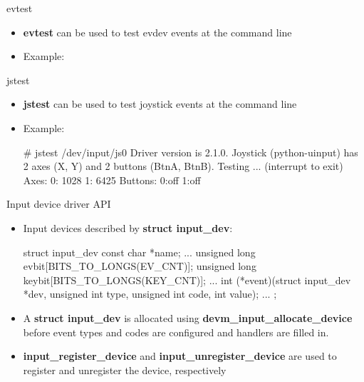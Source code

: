\begin{frame}
	{evtest}

	\begin{itemize}
		\item \textbf{evtest} can be used to test evdev events at the command line
		\item Example:
	\end{itemize}
\end{frame}

\begin{frame}
	{jstest}

	\begin{itemize}
		\item \textbf{jstest} can be used to test joystick events at the command line
		\item Example:
			\begin{rawscriptsize}
# jstest /dev/input/js0
Driver version is 2.1.0.
Joystick (python-uinput) has 2 axes (X, Y)
and 2 buttons (BtnA, BtnB).
Testing ... (interrupt to exit)
Axes:  0:  1028  1:  6425 Buttons:  0:off  1:off
			\end{rawscriptsize}
	\end{itemize}
\end{frame}

\begin{frame}
	{Input device driver API}
	\begin{itemize}
		\item
			Input devices described by \textbf{struct input\_dev}:
			\begin{rawfootnotesize}
struct input_dev {
	const char *name;
	...
	unsigned long evbit[BITS_TO_LONGS(EV_CNT)];
	unsigned long keybit[BITS_TO_LONGS(KEY_CNT)];
	...
	int (*event)(struct input_dev *dev, unsigned int type, unsigned int code, int value);
	...
};
			\end{rawfootnotesize}
		\item
			A \textbf{struct input\_dev} is allocated using \textbf{devm\_input\_allocate\_device} before event types and codes are configured and handlers are filled in.
		\item
			\textbf{input\_register\_device} and \textbf{input\_unregister\_device} are used to register and unregister the device, respectively
	\end{itemize}
\end{frame}

